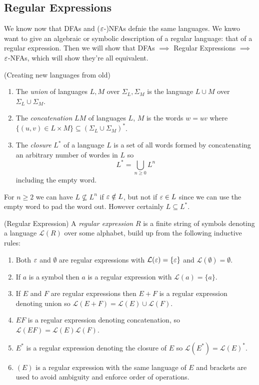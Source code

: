 \documentclass[tikx, border = 10pt]{article}
\begin{document}
\subsection{Regular Expressions}
We know now that DFAs and ($ \varepsilon $-)NFAs defnie the same languages. We knwo want to give an algebraic or symbolic description of a regular language: that of a regular expression. Then we will show that DFAs $ \implies $ Regular Expressions $ \implies $ $ \varepsilon $-NFAs, which will show they're all equivalent.
\begin{definition}
	(Creating new languages from old)
	\begin{enumerate}
		\item The \textit{union} of languages $ L,M $ over $ \Sigma_L, \Sigma_M $ is the language $ L \cup M $ over $ \Sigma_L \cup \Sigma_M $.
		\item The \textit{concatenation} $ LM $ of languages $ L $, $ M $ is the words $ w=uv $ where $ \{(u,v) \in L\times M\}\subseteq (\Sigma_L \cup \Sigma_M)^* $.
		\item The \textit{closure} $ L^* $ of a language $ L $ is a set of all words formed by concatenating an arbitrary number of wordes in $ L $ so
			\[
				L^* = \bigcup_{n\ge 0} L^n
			\]
			including the empty word.
	\end{enumerate}
\end{definition}
\begin{remark}
  For $ n\ge 2 $ we can have $ L\not\subseteq L^n $ if $ \varepsilon \notin L $, but not if $ \varepsilon \in L $ since we can use the empty word to pad the word out. However certainly $ L\subseteq L^* $.
\end{remark}
\begin{definition}
	(Regular Expression) A \textit{regular expression} $ R $ is a finite string of symbols denoting a language $ \mathcal L(R) $ over some alphabet, build up from the following inductive rules:
	\begin{enumerate}
	\item Both $ \varepsilon $ and $ \emptyset $ are regular expressions with $ \mathcal L(\varepsilon) = \{\varepsilon\} $ and $ \mathcal L(\emptyset) = \emptyset $.
	\item If $ a $ is a symbol then $ a $ is a regular expression with $ \mathcal L(a) = \{a\} $.
	\item If $ E $ and $ F $ are regular expressions then $ E+F $ is a regular expression denoting union so $ \mathcal L(E+F) = \mathcal L(E) \cup \mathcal L(F) $.
	\item $ EF $ is a regular expression denoting concatenation, so $ \mathcal L (EF) = \mathcal L(E)\mathcal L(F) $.
	\item $ E^* $ is a regular expression denoting the closure of $ E $ so $ \mathcal L(E^*) = \mathcal L(E)^* $.
	\item $ (E) $ is a regular expression with the same language of $ E $ and brackets are used to avoid ambiguity and enforce order of operations. 
	\end{enumerate}
\end{definition}
\end{document}
